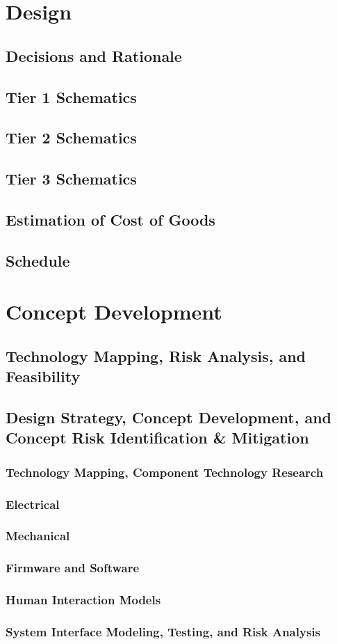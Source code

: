 \documentclass[a4paper, 10pt]{article}
\begin{document}
\section{Design}
	\subsection{Decisions and Rationale}
	\subsection{Tier 1 Schematics}
	\subsection{Tier 2 Schematics}
	\subsection{Tier 3 Schematics}
	\subsection{Estimation of Cost of Goods}
	\subsection{Schedule}
	
\pagebreak	

\section{Concept Development}
	\subsection{Technology Mapping, Risk Analysis, and Feasibility}
	\subsection{Design Strategy, Concept Development, and Concept Risk Identification \& Mitigation}
		\subsubsection{Technology Mapping, Component Technology Research}
		\subsubsection{Electrical}
		\subsubsection{Mechanical}
		\subsubsection{Firmware and Software}
		\subsubsection{Human Interaction Models}
		\subsubsection{System Interface Modeling, Testing, and Risk Analysis}

	
\end{document}

